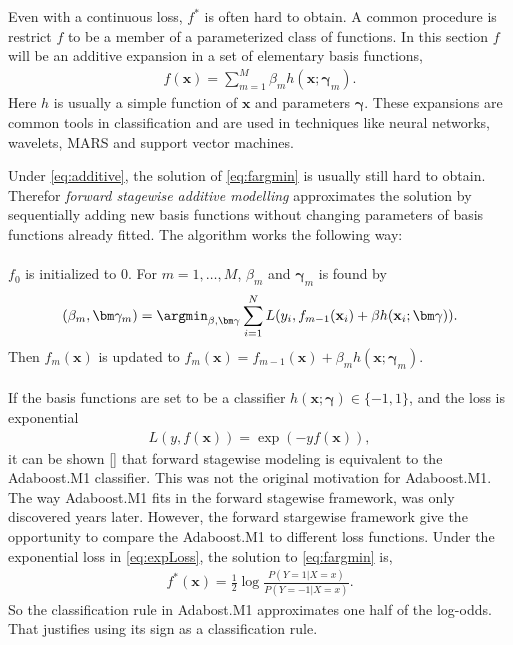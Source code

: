 Even with a continuous loss, $f^*$ is often hard to obtain. A common procedure is restrict $f$ to be a member of a parameterized class of functions. In this section $f$ will be an additive expansion in a set of elementary basis functions,
\begin{align}
  \label{eq:additive} 
  f(\mathbf{x}) =  \sum^{M}_{m=1} \beta_m h(\mathbf{x}; \bm{\gamma}_m).
\end{align}
Here $h$ is usually a simple function of $\mathbf{x}$ and parameters $\bm{\gamma}$. These expansions are common tools in classification and are used in techniques like neural networks, wavelets, MARS and support vector machines.

Under \eqref{eq:additive}, the solution of \eqref{eq:fargmin} is usually still hard to obtain. Therefor \textit{forward stagewise additive modelling} approximates the solution by sequentially adding new basis functions without changing parameters of basis functions already fitted. The algorithm works the following way:\\
\\
$f_0$ is initialized to 0. For $m = 1, \ldots, M$, $\beta_m$ and $\bm \gamma_m$ is found by
\begin{align}
  \label{eq:forStageWise} 
  (\beta_m, \bm \gamma_m) = \argmin_{\beta, \bm \gamma} \sum^{N}_{i=1} L(y_i, f_{m-1}(\mathbf{x}_i) + \beta h(\mathbf{x}_i; \bm \gamma)).
\end{align}
Then $f_m(\mathbf{x})$ is updated to $f_m(\mathbf{x}) = f_{m-1}(\mathbf{x}) + \beta_m h(\mathbf{x}; \bm \gamma_m)$.\\
\\
If the basis functions are set to be a classifier $h(\mathbf{x}; \bm \gamma) \in \{-1, 1\}$, and the loss is exponential
\begin{align}
  \label{eq:expLoss} 
  L(y, f(\mathbf{x})) = \exp (-y f(\mathbf{x})),
\end{align}
it can be shown [\cite{modstat}] that forward stagewise modeling is equivalent to the Adaboost.M1 classifier. This was not the original motivation for Adaboost.M1. The way Adaboost.M1 fits in the forward stagewise framework, was only discovered years later. However, the forward stargewise framework give the opportunity to compare the Adaboost.M1 to different loss functions. Under the exponential loss in \eqref{eq:expLoss}, the solution to \eqref{eq:fargmin} is,
\begin{align}
  f^*( \mathbf{x}) = \frac{1}{2} \log \frac{P(Y=1 |X=x)}{P(Y=-1 | X = x)} .
\end{align}
So the classification rule in Adabost.M1 approximates one half of the log-odds. That justifies using its sign as a classification rule.
%
